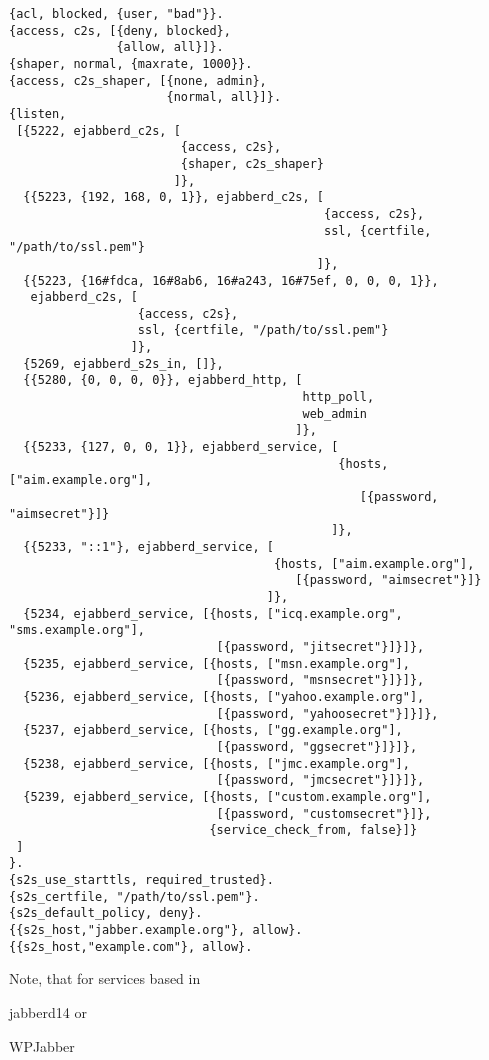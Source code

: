 \documentclass[a4paper,10pt]{book}
\newcommand{\ind}[1]{\begin{latexonly}\index{#1}\end{latexonly}}
\begin{document}
\begin{verbatim}
{acl, blocked, {user, "bad"}}.
{access, c2s, [{deny, blocked},
               {allow, all}]}.
{shaper, normal, {maxrate, 1000}}.
{access, c2s_shaper, [{none, admin},
                      {normal, all}]}.
{listen,
 [{5222, ejabberd_c2s, [
                        {access, c2s},
                        {shaper, c2s_shaper}
                       ]},
  {{5223, {192, 168, 0, 1}}, ejabberd_c2s, [
                                            {access, c2s},
                                            ssl, {certfile, "/path/to/ssl.pem"}
                                           ]},
  {{5223, {16#fdca, 16#8ab6, 16#a243, 16#75ef, 0, 0, 0, 1}},
   ejabberd_c2s, [
                  {access, c2s},
                  ssl, {certfile, "/path/to/ssl.pem"}
                 ]},
  {5269, ejabberd_s2s_in, []},
  {{5280, {0, 0, 0, 0}}, ejabberd_http, [
                                         http_poll,
                                         web_admin
                                        ]},
  {{5233, {127, 0, 0, 1}}, ejabberd_service, [
                                              {hosts, ["aim.example.org"],
                                                 [{password, "aimsecret"}]}
                                             ]},
  {{5233, "::1"}, ejabberd_service, [
                                     {hosts, ["aim.example.org"],
                                        [{password, "aimsecret"}]}
                                    ]},
  {5234, ejabberd_service, [{hosts, ["icq.example.org", "sms.example.org"],
                             [{password, "jitsecret"}]}]},
  {5235, ejabberd_service, [{hosts, ["msn.example.org"],
                             [{password, "msnsecret"}]}]},
  {5236, ejabberd_service, [{hosts, ["yahoo.example.org"],
                             [{password, "yahoosecret"}]}]},
  {5237, ejabberd_service, [{hosts, ["gg.example.org"],
                             [{password, "ggsecret"}]}]},
  {5238, ejabberd_service, [{hosts, ["jmc.example.org"],
                             [{password, "jmcsecret"}]}]},
  {5239, ejabberd_service, [{hosts, ["custom.example.org"],
                             [{password, "customsecret"}]},
                            {service_check_from, false}]}
 ]
}.
{s2s_use_starttls, required_trusted}.
{s2s_certfile, "/path/to/ssl.pem"}.
{s2s_default_policy, deny}.
{{s2s_host,"jabber.example.org"}, allow}.
{{s2s_host,"example.com"}, allow}.
\end{verbatim}
Note, that for services based in \ind{jabberd14}jabberd14 or \ind{WPJabber}WPJabber
\end{document}
